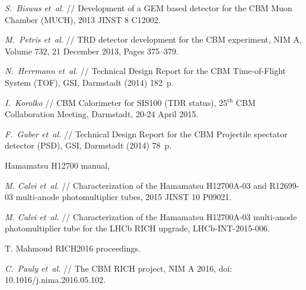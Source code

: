 \begin{thebibliography}{99}
\textit{S.~Biswas et~al.} //
Development of a GEM based detector for the CBM Muon Chamber (MUCH),
2013 JINST 8 C12002.

\textit{M.~Petris et~al.} //
TRD detector development for the CBM experiment,
NIM A, Volume 732, 21 December 2013, Pages 375–379.

\textit{N.~Herrmann et~al.} //
Technical Design Report for the CBM Time-of-Flight System (TOF),
GSI, Darmstadt (2014) 182~p.

\textit{I.~Korolko} //
CBM Calorimeter for SIS100 (TDR status),
25$^\mathrm{th}$ CBM Collaboration Meeting, Darmstadt, 20-24 April 2015.\\

\textit{F.~Guber et~al.} //
Technical Design Report for the CBM Projectile spectator detector (PSD),
GSI, Darmstadt (2014) 78~p.


Hamamatsu H12700 manual,

\textit{M. Calvi et~al.} //
Characterization of the Hamamatsu H12700A-03 and R12699-03 multi-anode photomultiplier tubes,
2015 JINST 10 P09021.

\textit{M. Calvi et~al.} //
Characterization of the Hamamatsu H12700A-03 multi-anode photomultiplier tube for the LHCb RICH upgrade,
LHCb-INT-2015-006.



T. Mahmoud RICH2016 proceedings.

\textit{C.~Pauly et~al.} //
The CBM RICH project,
NIM A 2016,
doi: 10.1016/j.nima.2016.05.102.


\end{thebibliography}
